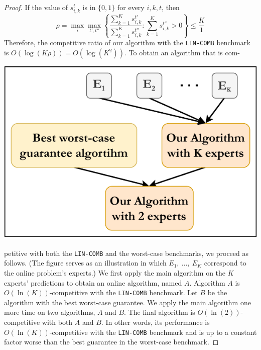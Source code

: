 \begin{proof}

	\noindent\begin{minipage}[t]{7.8cm}
		If the value of $s_{i,k}^{t}$ is in $\{0,1\}$ for every $i,k,t$, then
		\[
			\rho = \max_{i} \max_{t',t''} \left\{\frac{\sum_{k=1}^{K} s_{i,k}^{t'}}{\sum_{k=1}^{K} s_{i,k}^{t''}} : \sum_{k=1}^{K} s_{i,k}^{t''} > 0 \right\}
			\leq \frac{K}{1}
		\]
		Therefore, the competitive ratio of our algorithm with the \texttt{LIN-COMB} benchmark is $O(\log (K \rho)) = O(\log (K^2))$. \hfill To obtain an algorithm that is com-
	\end{minipage}
	\hspace{0.5cm}
	\begin{minipage}[t]{6.6cm}
			\vspace{-1.0cm}
			\includegraphics[width=\textwidth]{./Img/algo_mini.pdf}
			\vspace{-0.35cm}
			\label{fig:algo-layers}
	\end{minipage}

	\noindent petitive with both the \texttt{LIN-COMB} and the worst-case benchmarks,
	we proceed as follows. (The figure %
	serves as an illustration in which  $E_1,\ \dots,\ E_K$ correspond to the online problem's experts.)
	We first apply the main algorithm on the $K$ experts' predictions to obtain an online algorithm, named $A$.
	Algorithm $A$ is $O(\ln (K))$-competitive with the \texttt{LIN-COMB} benchmark. Let $B$ be the algorithm with the best worst-case guarantee.
	We apply the main algorithm one more time on two algorithms, $A$ and $B$. The final algorithm is $O(\ln (2))$-competitive with both $A$ and $B$.
	In other words, its performance is $O(\ln (K))$-competitive with the \texttt{LIN-COMB} benchmark and is up to a constant factor worse than the best guarantee in the worst-case benchmark.
\end{proof}

